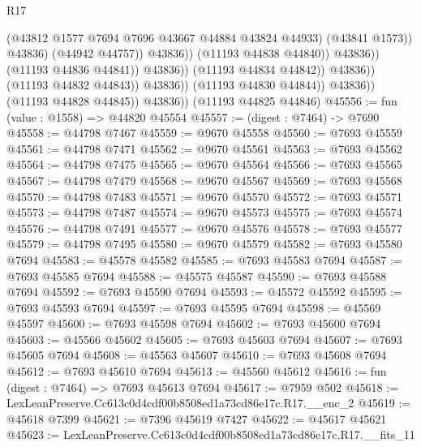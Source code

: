 \begin{lexlean}{R17}
\begin{coremodule}
                                                  (@43812
                                                    @1577
                                                    @7694
                                                    @7696
                                                    @43667
                                                    @44884
                                                    @43824
                                                    @44933)
                                                  (@43841 @1573))
                                                @43836)
                                              (@44942 @44757))
                                            @43836))
                                        (@11193 @44838 @44840))
                                      @43836))
                                  (@11193 @44836 @44841))
                                @43836))
                            (@11193 @44834 @44842))
                          @43836))
                      (@11193 @44832 @44843))
                    @43836))
                (@11193 @44830 @44844))
              @43836))
          (@11193 @44828 @44845))
        @43836))
    (@11193 @44825 @44846)
@45556 := fun (value : @1558) => @44820 @45554
@45557 := (digest : @7464) -> @7690
@45558 := @44798 @7467
@45559 := @9670 @45558
@45560 := @7693 @45559
@45561 := @44798 @7471
@45562 := @9670 @45561
@45563 := @7693 @45562
@45564 := @44798 @7475
@45565 := @9670 @45564
@45566 := @7693 @45565
@45567 := @44798 @7479
@45568 := @9670 @45567
@45569 := @7693 @45568
@45570 := @44798 @7483
@45571 := @9670 @45570
@45572 := @7693 @45571
@45573 := @44798 @7487
@45574 := @9670 @45573
@45575 := @7693 @45574
@45576 := @44798 @7491
@45577 := @9670 @45576
@45578 := @7693 @45577
@45579 := @44798 @7495
@45580 := @9670 @45579
@45582 := @7693 @45580 @7694
@45583 := @45578 @45582
@45585 := @7693 @45583 @7694
@45587 := @7693 @45585 @7694
@45588 := @45575 @45587
@45590 := @7693 @45588 @7694
@45592 := @7693 @45590 @7694
@45593 := @45572 @45592
@45595 := @7693 @45593 @7694
@45597 := @7693 @45595 @7694
@45598 := @45569 @45597
@45600 := @7693 @45598 @7694
@45602 := @7693 @45600 @7694
@45603 := @45566 @45602
@45605 := @7693 @45603 @7694
@45607 := @7693 @45605 @7694
@45608 := @45563 @45607
@45610 := @7693 @45608 @7694
@45612 := @7693 @45610 @7694
@45613 := @45560 @45612
@45616 := fun (digest : @7464) => @7693 @45613 @7694
@45617 := @7959 @502
@45618 := LexLeanPreserve.Cc613c0d4cdf00b8508ed1a73cd86e17c.R17.__enc_2
@45619 := @45618 @7399
@45621 := @7396 @45619 @7427
@45622 := @45617 @45621
@45623 := LexLeanPreserve.Cc613c0d4cdf00b8508ed1a73cd86e17c.R17.__fits_11

\end{coremodule}
\end{lexlean}

